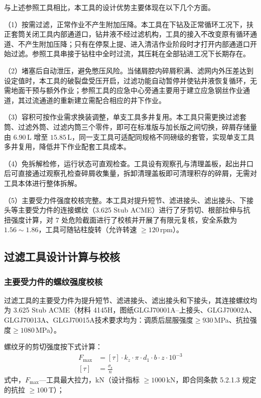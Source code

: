 与上述参照工具相比，本工具的设计优势主要体现在以下几个方面。

（1）按需过滤，正常作业不产生附加压降。本工具在下钻及正常循环工况下，扶正套筒关闭工具内部通道口，钻井液不经过滤机构，工具的接入不改变原有循环通道、不产生附加压降；只有在停泵上提、进入清洁作业阶段时才打开内部通道口开始过滤。参照工具串接于钻柱中全时过流，其压耗在全部钻进工况下长期存在。

（2）堵塞后自动泄压，避免憋压风险。当储屑腔内碎屑积满、滤网内外压差达到设定值时，本工具的破裂盘受压开启，过滤功能自动暂停并使钻井液恢复循环，无需地面干预与额外作业；参照工具的应急中心旁通主要用于建立应急钢丝作业通道，其过流通道的重新建立需配合相应的井下作业。

（3）容积可按作业需求换装调整，单支工具多井复用。本工具只需更换过滤套筒、过滤外筒、过滤内筒三个零件，即可在标准版与加长版之间切换，碎屑存储量由 $6.90\,\text{L}$ 增至 $15.85\,\text{L}$，同一支工具可适配同规格不同磅级的套管，实现单支工具多井复用，降低井下作业配套工具成本。

（4）免拆解检修，运行状态可直观检查。工具设有观察孔与清理盖板，起出井口后可直接通过观察孔检查碎屑收集量，拆卸清理盖板即可清理积存的碎屑，无需对工具本体进行整体拆解。

（5）主要受力件强度校核完整。本工具对提升短节、滤进接头、滤出接头、下接头等主要受力件的连接螺纹（3.625 Stub ACME）进行了牙剪切、根部拉伸与抗扭强度计算，对 7 处危险截面进行了校核并开展了有限元复核，安全系数为 $1.56\sim 1.86$，工具可随钻柱旋转（允许转速 $\ge 120\,\text{rpm}$）。

\subsection{过滤工具设计计算与校核}
\subsubsection{主要受力件的螺纹强度校核}

过滤工具的主要受力件为提升短节、滤进接头、滤出接头和下接头，其连接螺纹均为 3.625 Stub ACME（材料 4145H，图纸GLGJ70001A--上接头、GLGJ70002A、GLGJ70013A、GLGJ70015A技术要求均为：调质后屈服强度$\ge 930$\,MPa、抗拉强度$\ge 1080$\,MPa）。

螺纹牙的剪切强度按下式计算：
\begin{equation}
    \begin{aligned}
        F_{\max} &= [\tau] \cdot k_z \cdot \pi \cdot d_1 \cdot b \cdot z \cdot 10^{-3} \\
        [\tau] &= \frac{\sigma_{\mathrm{s}}}{n}
    \end{aligned}
\end{equation}
式中，$F_{\max}$---工具最大拉力，kN（设计指标 $\ge 1000$\,kN，即合同条款 5.2.1.3 规定的抗拉 $\ge 100$\,T）；

